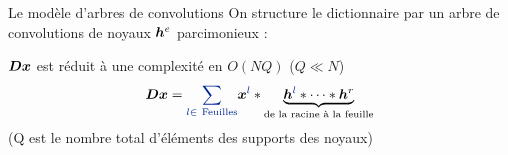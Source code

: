 \begin{frame}{Le modèle d'arbres de convolutions}
On structure le dictionnaire par un arbre de convolutions de noyaux $\bm{h}^e$ parcimonieux :
\begin{figure}\centering
{}
\end{figure}
$\bm{D}\bm{x}$ est réduit à une complexité en \alert{$O(NQ)$} ($Q \ll N$) 
\begin{equation}
\D \x = \Beq{\sum_{l \in ~\text{Feuilles}}} \x^{\Beq{l}} * \underbrace{\h^{\Beq{l}}* \dots* \h^{r}}_{\textrm{de la racine à la feuille}}
\end{equation}
{\small (Q est le nombre total d'éléments des supports des noyaux)}
\end{frame}
 

